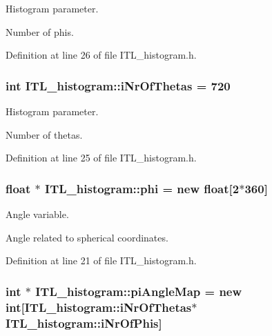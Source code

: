 Histogram parameter. 

Number of phis. 

Definition at line 26 of file ITL\_\-histogram.h.

\hypertarget{classITL__histogram_a635c7179b23ea13e38258f24582e3e8b}{
\subsubsection[{iNrOfThetas}]{\setlength{\rightskip}{0pt plus 5cm}int {\bf ITL\_\-histogram::iNrOfThetas} = 720}}
\label{classITL__histogram_a635c7179b23ea13e38258f24582e3e8b}


Histogram parameter. 

Number of thetas. 

Definition at line 25 of file ITL\_\-histogram.h.

\hypertarget{classITL__histogram_a055060af9afbc0a52ded8c00b7532ab4}{
\subsubsection[{phi}]{\setlength{\rightskip}{0pt plus 5cm}float $\ast$ {\bf ITL\_\-histogram::phi} = new float\mbox{[}2$\ast$360\mbox{]}}}
\label{classITL__histogram_a055060af9afbc0a52ded8c00b7532ab4}


Angle variable. 

Angle related to spherical coordinates. 

Definition at line 21 of file ITL\_\-histogram.h.

\hypertarget{classITL__histogram_aafbb8f075bd599b3f4fa8916473b0062}{
\subsubsection[{piAngleMap}]{\setlength{\rightskip}{0pt plus 5cm}int $\ast$ {\bf ITL\_\-histogram::piAngleMap} = new int\mbox{[}{\bf ITL\_\-histogram::iNrOfThetas}$\ast${\bf ITL\_\-histogram::iNrOfPhis}\mbox{]}}}
\label{classITL__histogram_aafbb8f075bd599b3f4fa8916473b0062}


